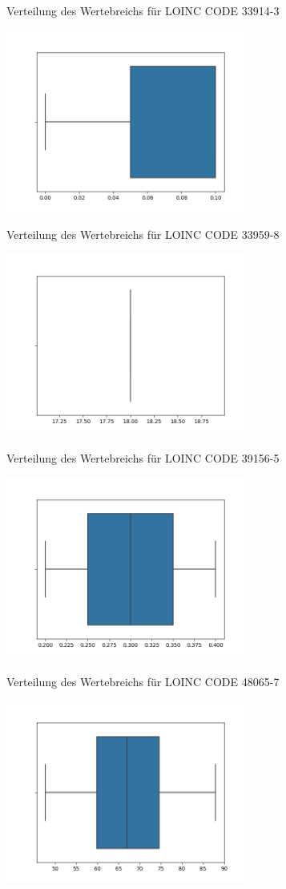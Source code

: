 \documentclass[12pt,a4paper,toc=bibliographynumbered,toc=indenttextentries]{scrreprt}
\begin{document}
\begin{center}
			\small{Verteilung des Wertebreichs für LOINC CODE 33914-3}
			
			\includegraphics[width=8cm]{Graphs/33959-8.png}
			
			\small{Verteilung des Wertebreichs für LOINC CODE 33959-8}
			
			\includegraphics[width=8cm]{Graphs/39156-5.png}
			
			\small{Verteilung des Wertebreichs für LOINC CODE 39156-5}
			
			\includegraphics[width=8cm]{Graphs/48065-7.png}
			
			\small{Verteilung des Wertebreichs für LOINC CODE 48065-7}
			
			\includegraphics[width=8cm]{Graphs/59576-9.png}
			

\end{center}
\end{document}
